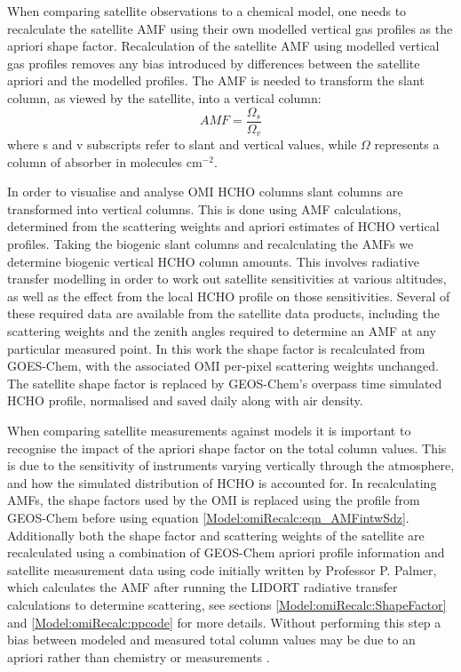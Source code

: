   \label{Model:omiRecalc}
  
  When comparing satellite observations to a chemical model, one needs to recalculate the satellite AMF using their own modelled vertical gas profiles as the apriori shape factor.
  Recalculation of the satellite AMF using modelled vertical gas profiles removes any bias introduced by differences between the satellite apriori and the modelled profiles.
  The AMF is needed to transform the slant column, as viewed by the satellite, into a vertical column:
  \begin{equation}
  \label{eqn:AMFratio}
  AMF = \frac{\Omega_s}{\Omega_v} %
  \end{equation}
  where s and v subscripts refer to slant and vertical values, while $\Omega$ represents a column of absorber in molecules cm$^{-2}$.
  
  In order to visualise and analyse OMI HCHO columns slant columns are transformed into vertical columns. 
  This is done using AMF calculations, determined from the scattering weights and apriori estimates of HCHO vertical profiles.
  Taking the biogenic slant columns and recalculating the AMFs we determine biogenic vertical HCHO column amounts.
  This involves radiative transfer modelling in order to work out satellite sensitivities at various altitudes, as well as the effect from the local HCHO profile on those sensitivities.
  Several of these required data are available from the satellite data products, including the scattering weights and the zenith angles required to determine an AMF at any particular measured point.
  In this work the shape factor is recalculated from GOES-Chem, with the associated OMI per-pixel scattering weights unchanged. 
  The satellite shape factor is replaced by GEOS-Chem's overpass time simulated HCHO profile, normalised and saved daily along with air density.
  
  When comparing satellite measurements against models it is important to recognise the impact of the apriori shape factor on the total column values.
  This is due to the sensitivity of instruments varying vertically through the atmosphere, and how the simulated distribution of HCHO is accounted for.
  In recalculating AMFs, the shape factors used by the OMI is replaced using the profile from GEOS-Chem before using equation \ref{Model:omiRecalc:eqn_AMFintwSdz}.
  Additionally both the shape factor and scattering weights of the satellite are recalculated using a combination of GEOS-Chem apriori profile information and satellite measurement data using code initially written by Professor P. Palmer, which calculates the AMF after running the LIDORT radiative transfer calculations to determine scattering, see sections \ref{Model:omiRecalc:ShapeFactor} and \ref{Model:omiRecalc:ppcode} for more details.
  Without performing this step a bias between modeled and measured total column values may be due to an apriori rather than chemistry or measurements \parencite{Palmer2001, Lamsal2014}.
  
